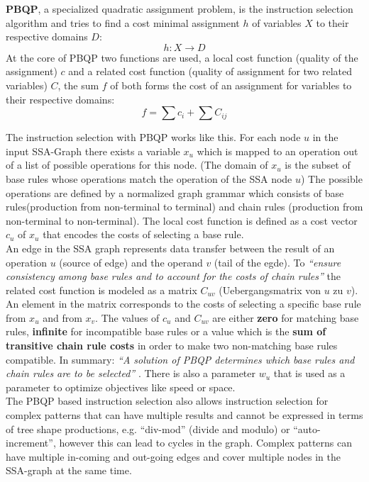 \documentclass[a4paper,10pt]{article}
\begin{document}
\textbf{PBQP}, a specialized quadratic assignment problem, is the instruction selection algorithm and tries to find a cost minimal assignment $h$ of variables $X$ to their respective domains $D$:
\[ h: X \rightarrow D\]
At the core of PBQP two functions are used, a local cost function (quality of the assignment) $c$ and a related cost function (quality of assignment for two related variables) $C$, the sum $f$ of both forms the cost of an assignment for variables to their respective domains:
\[ f = \sum c_i + \sum{C_{ij}} \]

The instruction selection with PBQP works like this. For each node $u$ in the input SSA-Graph there exists a variable $x_u$ which is mapped to an operation out of a list of possible operations for this node. (The domain of $x_{u}$ is the subset of base rules whose operations match the operation of the SSA node $u$) The possible operations are defined by a normalized graph grammar which consists of base rules(production from non-terminal to terminal) and chain rules (production from non-terminal to non-terminal). The local cost function is defined as a cost vector $c_u$ of $x_{u}$ that encodes the costs of selecting a base rule.\\
An edge in the SSA graph represents data transfer between the result of an operation $u$ (source of edge) and the operand $v$ (tail of the egde). To \textit{``ensure consistency among base rules and to account for the costs of chain rules''} the related cost function is modeled as a matrix $C_{uv}$ (Uebergangsmatrix von $u$ zu $v$). An element in the matrix corresponds to the costs of selecting a specific base rule from $x_{u}$ and from $x_{v}$. The values of $c_u$ and $C_{uv}$ are either \textbf{zero} for matching base rules, \textbf{infinite} for incompatible base rules or a value which is the \textbf{sum of transitive chain rule costs} in order to make two non-matching base rules compatible. In summary: \textit{``A solution of PBQP determines which base rules and chain rules are to be selected''} \cite{pbqp-instruction-selection}. There is also a parameter $w_{u}$ that is used as a parameter to optimize objectives like speed or space.\\

The PBQP based instruction selection also allows instruction selection for complex patterns that can have multiple results and cannot be expressed in terms of tree shape productions, e.g. ``div-mod'' (divide and modulo) or ``auto-increment'', however this can lead to cycles in the graph. Complex patterns can have multiple in-coming and out-going edges and cover multiple nodes in the SSA-graph at the same time.\\
\end{document}
